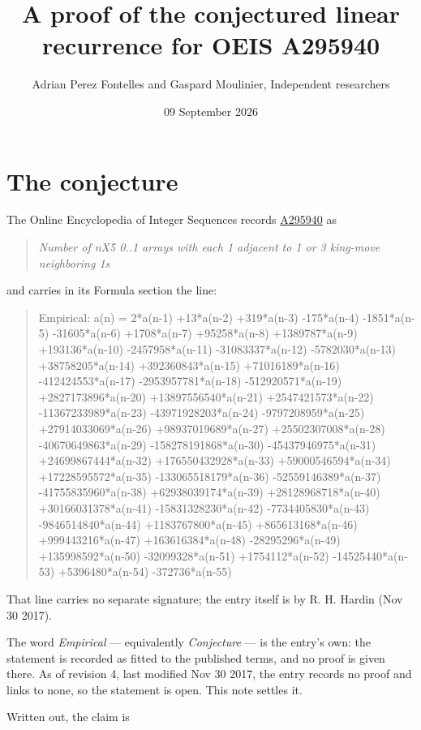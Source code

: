 \documentclass[11pt]{article}
\title{A proof of the conjectured linear recurrence for OEIS A295940}
\author{Adrian Perez Fontelles and Gaspard Moulinier, Independent researchers}
\date{09 September 2026}
\theoremstyle{definition}
\begin{document}
\maketitle
\section{The conjecture}

The Online Encyclopedia of Integer Sequences records \href{https://oeis.org/A295940}{A295940} as

\begin{quote}\itshape Number of nX5 0..1 arrays with each 1 adjacent to 1 or 3 king-move neighboring 1s\end{quote}

and carries in its Formula section the line:

\begin{quote}\ttfamily Empirical: a(n) = 2*a(n-1) +13*a(n-2) +319*a(n-3) -175*a(n-4) -1851*a(n-5) -31605*a(n-6) +1708*a(n-7) +95258*a(n-8) +1389787*a(n-9) +193136*a(n-10) -2457958*a(n-11) -31083337*a(n-12) -5782030*a(n-13) +38758205*a(n-14) +392360843*a(n-15) +71016189*a(n-16) -412424553*a(n-17) -2953957781*a(n-18) -512920571*a(n-19) +2827173896*a(n-20) +13897556540*a(n-21) +2547421573*a(n-22) -11367233989*a(n-23) -43971928203*a(n-24) -9797208959*a(n-25) +27914033069*a(n-26) +98937019689*a(n-27) +25502307008*a(n-28) -40670649863*a(n-29) -158278191868*a(n-30) -45437946975*a(n-31) +24699867444*a(n-32) +176550432928*a(n-33) +59000546594*a(n-34) +17228595572*a(n-35) -133065518179*a(n-36) -52559146389*a(n-37) -41755835960*a(n-38) +62938039174*a(n-39) +28128968718*a(n-40) +30166031378*a(n-41) -15831328230*a(n-42) -7734405830*a(n-43) -9846514840*a(n-44) +1183767800*a(n-45) +865613168*a(n-46) +999443216*a(n-47) +163616384*a(n-48) -28295296*a(n-49) +135998592*a(n-50) -32099328*a(n-51) +1754112*a(n-52) -14525440*a(n-53) +5396480*a(n-54) -372736*a(n-55)\end{quote}

That line carries no separate signature; the entry itself is by R. H. Hardin (Nov 30 2017).

The word {\itshape Empirical} --- equivalently {\itshape Conjecture} --- is the entry's own: the statement is recorded as fitted to the published terms, and no proof is given there. As of revision 4, last modified Nov 30 2017, the entry records no proof and links to none, so the statement is open. This note settles it.

Written out, the claim is
\end{document}
